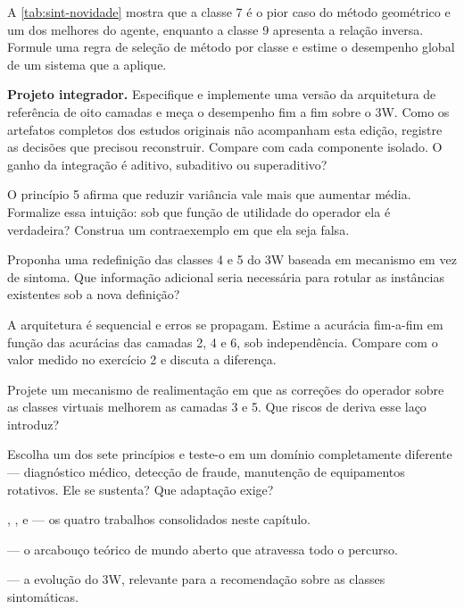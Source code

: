\begin{exercicios}
\item A \cref{tab:sint-novidade} mostra que a classe 7 é o pior caso do método geométrico
      e um dos melhores do agente, enquanto a classe 9 apresenta a relação inversa.
      Formule uma regra de seleção de método por classe e estime o desempenho global de
      um sistema que a aplique.

\item \textbf{Projeto integrador.} Especifique e implemente uma versão da arquitetura de
      referência de oito camadas e meça o desempenho fim a fim sobre o 3W. Como os
      artefatos completos dos estudos originais não acompanham esta edição, registre as
      decisões que precisou reconstruir. Compare com cada componente isolado. O ganho da
      integração é aditivo, subaditivo ou superaditivo?

\item O princípio 5 afirma que reduzir variância vale mais que aumentar média. Formalize
      essa intuição: sob que função de utilidade do operador ela é verdadeira? Construa um
      contraexemplo em que ela seja falsa.

\item Proponha uma redefinição das classes 4 e 5 do 3W baseada em mecanismo em vez de
      sintoma. Que informação adicional seria necessária para rotular as instâncias
      existentes sob a nova definição?

\item A arquitetura é sequencial e erros se propagam. Estime a acurácia fim-a-fim em
      função das acurácias das camadas 2, 4 e 6, sob independência. Compare com o valor
      medido no exercício 2 e discuta a diferença.

\item Projete um mecanismo de realimentação em que as correções do operador sobre as
      classes virtuais melhorem as camadas 3 e 5. Que riscos de deriva esse laço
      introduz?

\item Escolha um dos sete princípios e teste-o em um domínio completamente diferente ---
      diagnóstico médico, detecção de fraude, manutenção de equipamentos rotativos.
      Ele se sustenta? Que adaptação exige?
\end{exercicios}

\begin{leituras}
\item \citet{LopesTese2025}, \citet{Lopes2026PST}, \citet{Lopes2026OTC} e
      \citet{Lopes2026LLM} --- os quatro trabalhos consolidados neste capítulo.
\item \citet{Scheirer2013} --- o arcabouço teórico de mundo aberto que atravessa todo o
      percurso.
\item \citet{VazVargas2026_3w2} --- a evolução do 3W, relevante para a recomendação sobre as
      classes sintomáticas.
\end{leituras}
